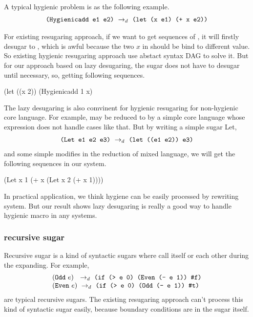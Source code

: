 
A typical hygienic problem is as the following example.
\[
\texttt{(Hygienicadd e1 e2)} ~\rightarrow_d~ \texttt{(let (x e1) (+ x e2))}
\]

For existing resugaring approach, if we want to get sequences of , it will firstly desugar to , which is awful because the two $x$ in  should be bind to different value. So existing hygienic resugaring approach use abstact syntax DAG to solve it. But for our approach based on lazy desugaring, the  sugar does not have to desugar until necessary, so, getting following sequences.

\begin{Codes}
    (let ((x 2)) (Hygienicadd 1 x)
\end{Codes}

The lazy desugaring is also comvinent for hygienic resugaring for non-hygienic core language. For example,  may be reduced to  by a simple core language whose  expression does not handle cases like that. But by writing a simple sugar Let,
\[\texttt{(Let~e1~e2~e3)} ~\rightarrow_d~ \texttt{(let~((e1~e2))~e3)}\]
and some simple modifies in the reduction of mixed language, we will get the following sequences in our system.
\begin{Codes}
    (Let x 1 (+ x (Let x 2 (+ x 1))))
\end{Codes}

In practical application, we think hygiene can be easily processed by rewriting system. But our result shows lazy desugaring is really a good way to handle hygienic macro in any systems.

\subsubsection{recursive sugar}
Recursive sugar is a kind of syntactic sugars where call itself or each other during the expanding. For example,
\[
\begin{array}{l}
(\mbox{\tt Odd}~e)~ ~\rightarrow_d~ \texttt{(if (> e 0) (Even (- e 1)) \#f)}\\
(\mbox{\tt Even}~e) ~\rightarrow_d~ \texttt{(if (> e 0) (Odd (- e 1)) \#t)}
\end{array}
\]
are typical recursive sugars. The existing resugaring approach can't process this kind of syntactic sugar easily, because boundary conditions are in the sugar itself.

